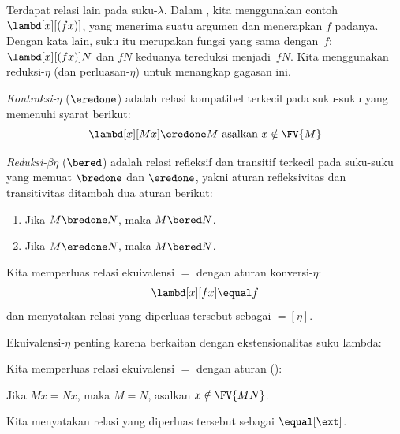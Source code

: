 \documentclass[../../../include/open-logic-section]{subfiles}
\begin{document}

Terdapat relasi lain pada suku-$\lambda$. Dalam , kita
menggunakan contoh $\lambd[x][(fx)]$, yang menerima suatu argumen dan
menerapkan $f$ padanya. Dengan kata lain, suku itu merupakan fungsi yang sama
dengan~$f$: $\lambd[x][(fx)]N$ dan $fN$ keduanya tereduksi menjadi~$fN$. Kita
menggunakan reduksi-$\eta$ (dan perluasan-$\eta$) untuk menangkap gagasan ini.

\begin{defn}
  \emph{Kontraksi-$\eta$} ($\eredone$) adalah relasi kompatibel terkecil pada
  suku-suku yang memenuhi syarat berikut:
  \[
    \lambd[x][M x] \eredone M \text{ asalkan } x \notin \FV{M}
  \]
\end{defn}

\begin{defn} 
  \emph{Reduksi-$\beta\eta$} ($\bered$) adalah relasi refleksif dan transitif
  terkecil pada suku-suku yang memuat $\bredone$ dan $\eredone$, yakni aturan
  refleksivitas dan transitivitas ditambah dua aturan berikut:
  \begin{enumerate}
  \item Jika $M \bredone N$, maka $M \bered N$. 
  \item Jika $M \eredone N$, maka $M \bered N$. 
  \end{enumerate}

\end{defn}

\begin{defn}
  Kita memperluas relasi ekuivalensi $\equal$ dengan aturan konversi-$\eta$:
  \[
  \lambd[x][f x] \equal f
  \]
  dan menyatakan relasi yang diperluas tersebut sebagai $\equal[\eta]$.
\end{defn}

Ekuivalensi-$\eta$ penting karena berkaitan dengan ekstensionalitas suku
lambda:

\begin{defn}[Ekstensionalitas]
  Kita memperluas relasi ekuivalensi $\equal$ dengan aturan (\ext):
  \begin{center}
  Jika $Mx \equal Nx$, maka $M \equal N$, asalkan $x \notin \FV{MN}$.
  \end{center}
  Kita menyatakan relasi yang diperluas tersebut sebagai $\equal[\ext]$.
\end{defn}
\end{document}

